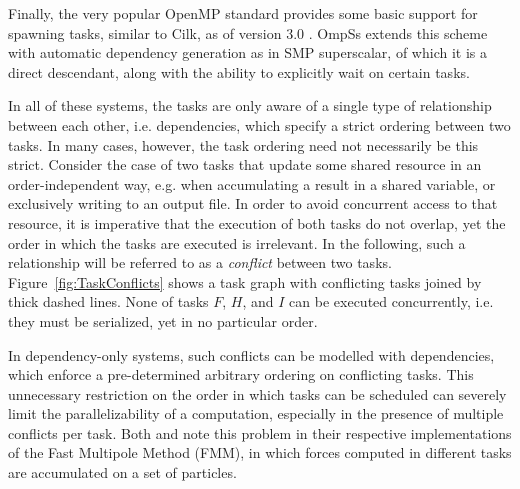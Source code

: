 \documentclass[preprint]{elsarticle}
\newcommand{\fig}[1]
    {Figure~\ref{fig:#1}}
\begin{document}
Finally, the very popular OpenMP standard provides some basic support
for spawning tasks, similar to Cilk, as of version 3.0
\cite{ref:OpenMP2008}.
OmpSs \cite{ref:Duran2011} extends this scheme with automatic
dependency generation as in SMP superscalar, of which it
is a direct descendant, along with
the ability to explicitly wait on certain tasks.

In all of these systems, the tasks are only aware of a single
type of relationship between each other, i.e. dependencies, which
specify a strict ordering between two tasks.
In many cases, however, the task ordering need not necessarily
be this strict.
Consider the case of two tasks that update some shared resource
in an order-independent way, e.g. when accumulating a result in
a shared variable, or exclusively writing to an output file.
In order to avoid concurrent access to that resource, it is
imperative that the execution of both tasks do not overlap,
yet the order in which the tasks are executed is irrelevant.
In the following, such a relationship will be referred to
as a {\em conflict} between two tasks.
\fig{TaskConflicts} shows a task graph with conflicting tasks
joined by thick dashed lines.
None of tasks $F$, $H$, and $I$ can be executed concurrently,
i.e. they must be serialized, yet in no particular order.

In dependency-only systems, such conflicts can be modelled
with dependencies, which enforce a pre-determined arbitrary
ordering on conflicting tasks.
This unnecessary restriction on the order
in which tasks can be scheduled can severely limit the
parallelizability of a computation, especially in the presence
of multiple conflicts per task.
Both \cite{ref:Ltaief2012} and \cite{ref:Agullo2013} note
this problem in their respective implementations of the Fast Multipole
Method (FMM), in which forces computed in different tasks are
accumulated on a set of particles.
\end{document}
